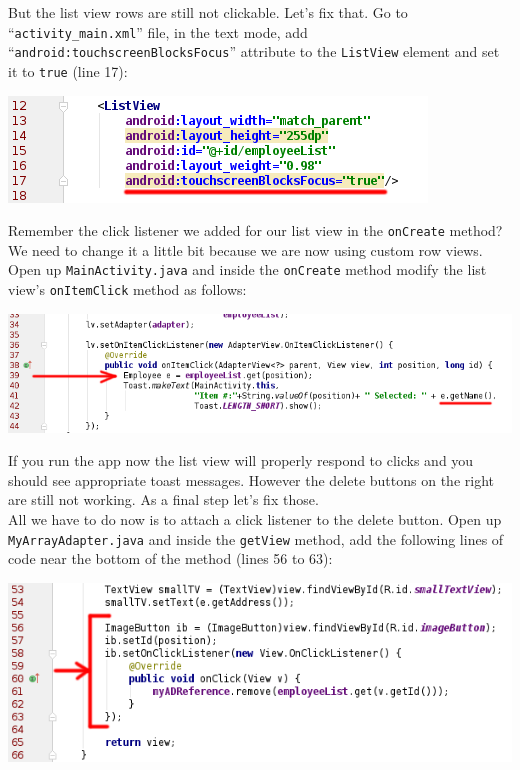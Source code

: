 But the list view rows are still not clickable. Let's fix that. Go to ``\texttt{activity\_main.xml}'' file, in the text mode, add ``\texttt{android:touchscreenBlocksFocus}'' attribute to the \texttt{ListView} element and set it to \texttt{true} (line 17):

\begin{center}
	\includegraphics[scale=0.4]{chapters/ch10/images/49}
\end{center}

Remember the click listener we added for our list view in the \texttt{onCreate} method? We need to change it a little bit because we are now using custom row views. Open up \texttt{MainActivity.java} and inside the \texttt{onCreate} method modify the list view's \texttt{onItemClick} method as follows:

\begin{center}
	\includegraphics[scale=0.4]{chapters/ch10/images/50}
\end{center}

If you run the app now the list view will properly respond to clicks and you should see appropriate toast messages. However the delete buttons on the right are still not working. As a final step let's fix those. \\

All we have to do now is to attach a click listener to the delete button. Open up \texttt{MyArrayAdapter.java} and inside the \texttt{getView} method, add the following lines of code near the bottom of the method (lines 56 to 63):

\begin{center}
	\includegraphics[scale=0.4]{chapters/ch10/images/51}
\end{center}

